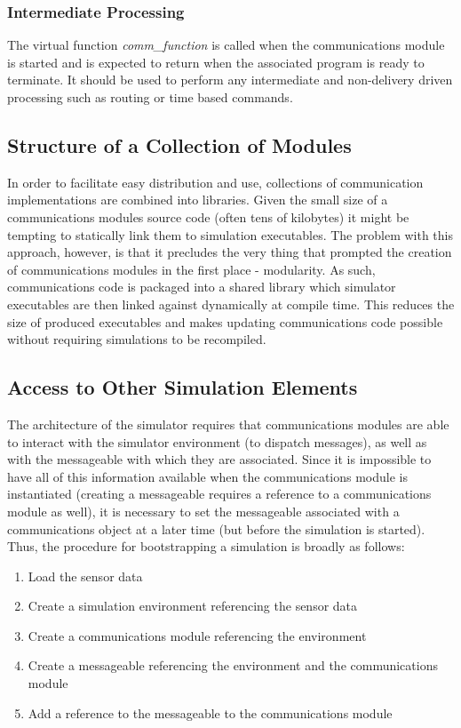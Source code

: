 \subsubsection{Intermediate Processing}
The virtual function \textit{comm\_function} is called when the communications module is started and is expected to return when the associated program is ready to terminate. It should be used to perform any intermediate and non-delivery driven processing such as routing or time based commands.
		
\subsection{Structure of a Collection of Modules}
	
In order to facilitate easy distribution and use, collections of communication implementations are combined into libraries. Given the small size of a communications modules source code (often tens of kilobytes) it might be tempting to statically link them to simulation executables. The problem with this approach, however, is that it precludes the very thing that prompted the creation of communications modules in the first place - modularity. As such, communications code is packaged into a shared library which simulator executables are then linked against dynamically at compile time. This reduces the size of produced executables and makes updating communications code possible without requiring simulations to be recompiled.

\subsection{Access to Other Simulation Elements}
		
The architecture of the simulator requires that communications modules are able to interact with the simulator environment (to dispatch messages), as well as with the messageable with which they are associated. Since it is impossible to have all of this information available when the communications module is instantiated (creating a messageable requires a reference to a communications module as well), it is necessary to set the messageable associated with a communications object at a later time (but before the simulation is started). Thus, the procedure for bootstrapping a simulation is broadly as follows:

\begin{enumerate}
	\item Load the sensor data
	\item Create a simulation environment referencing the sensor data
	\item Create a communications module referencing the environment
	\item Create a messageable referencing the environment and the communications module
	\item Add a reference to the messageable to the communications module
\end{enumerate}

